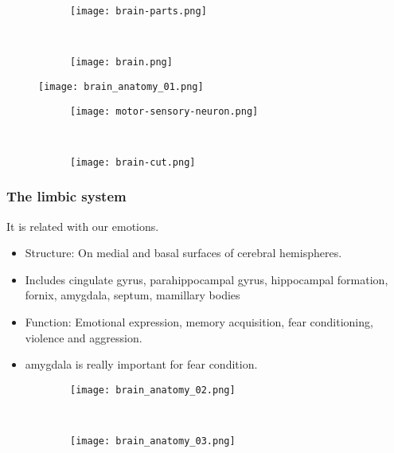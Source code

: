 \documentclass[main]{subfiles}
\begin{document}
\begin{figure}[H]
	\centering
	\begin{subfigure}[b]{0.5\textwidth}
		\centering
		\texttt{[image: brain-parts.png]}
	\end{subfigure}%
	~
	\begin{subfigure}[b]{0.5\textwidth}
		\centering
		\texttt{[image: brain.png]}
	\end{subfigure}
\end{figure}
\begin{figure}[H]
	\centering
	\texttt{[image: brain\_anatomy\_01.png]}
\end{figure}
\begin{figure}[H]
	\centering
	\begin{subfigure}[b]{0.5\textwidth}
		\centering
		\texttt{[image: motor-sensory-neuron.png]}
	\end{subfigure}%
	~
	\begin{subfigure}[b]{0.5\textwidth}
		\centering
		\texttt{[image: brain-cut.png]}
	\end{subfigure}
\end{figure}

\subsubsection{The limbic system}
It is related with our emotions.

\begin{itemize}[noitemsep,nolistsep]
	\item Structure: On medial and basal surfaces of cerebral hemispheres.
	\item Includes cingulate gyrus, parahippocampal gyrus, hippocampal formation, fornix, amygdala, septum, mamillary bodies
	\item Function: Emotional expression, memory acquisition, fear conditioning, violence and aggression.
	\item amygdala is really important for fear condition.
\end{itemize}
\begin{figure}[H]
	\centering
	\begin{subfigure}[b]{0.5\textwidth}
		\centering
		\texttt{[image: brain\_anatomy\_02.png]}
	\end{subfigure}%
	~
	\begin{subfigure}[b]{0.5\textwidth}
		\centering
		\texttt{[image: brain\_anatomy\_03.png]}
	\end{subfigure}
\end{figure}
\end{document}
